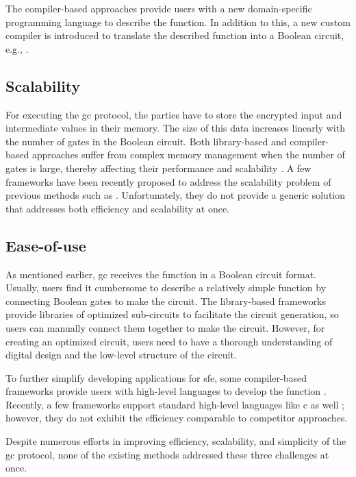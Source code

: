 The compiler-based approaches provide users with a new domain-specific programming language to describe the function.
In addition to this, a new custom compiler is introduced to translate the described function into a Boolean circuit, e.g., \cite{malkhi2004fairplay,kreuter2012billion,kreuter2013pcf,franz2014cbmc}.

\subsection{Scalability}
For executing the \acrshort{gc} protocol, the parties have to store the encrypted input and intermediate values in their memory.
The size of this data increases linearly with the number of gates in the Boolean circuit.
Both library-based and compiler-based approaches suffer from complex memory management when the number of gates is large, thereby affecting their performance and scalability \cite{henecka2013faster, kreuter2013pcf}.
A few frameworks have been recently proposed to address the scalability problem of previous methods such as \cite{malka2011vmcrypt, mood2012memory, kreuter2012billion, kreuter2013pcf}.
Unfortunately, they do not provide a generic solution that addresses both efficiency and scalability at once.

\subsection{Ease-of-use}
As mentioned earlier, \acrshort{gc} receives the function in a Boolean circuit format.
Usually, users find it cumbersome to describe a relatively simple function by connecting Boolean gates to make the circuit.
The library-based frameworks provide libraries of optimized sub-circuits to facilitate the circuit generation, so users can manually connect them together to make the circuit.
However, for creating an optimized circuit, users need to have a thorough understanding of digital design and the low-level structure of the circuit.

To further simplify developing applications for \acrshort{sfe}, some compiler-based frameworks provide users with high-level languages to develop the function \cite{mood2012memory,kreuter2012billion,kreuter2013pcf,liu2015oblivm}.
Recently, a few frameworks support standard high-level languages like \gls{c} as well \cite{holzer2012secure, franz2014cbmc, zahur2015obliv, mood2016frigate}; however, they do not exhibit the efficiency comparable to competitor approaches.

Despite numerous efforts in improving efficiency, scalability, and simplicity of the \acrshort{gc} protocol, none of the existing methods addressed these three challenges at once.


